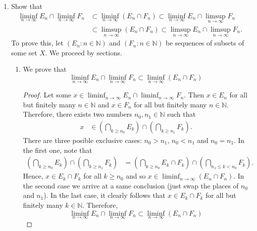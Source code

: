 \documentclass[12pt]{article}
\newcommand{\N}{\mathbb{N}}
\newenvironment{problem}[2][Problem]{\begin{trivlist}
		\item[\hskip \labelsep {\bfseries #1}\hskip \labelsep {\bfseries #2.}]}{\end{trivlist}}
\begin{document}
\begin{problem}{1}
\begin{enumerate}[label=(\alph*)]
	\item Show that
	\begin{align*}
		\liminf_{n\to \infty} E_{n} \cap \liminf_{n\to \infty} F_{n} &\subset \liminf_{n\to \infty} \left(E_{n} \cap F_{n}\right) \subset \liminf_{n\to \infty} E_{n} \cap \limsup_{n\to \infty} F_{n}\\
		& \subset \limsup_{n\to \infty} \left(E_{n} \cap F_{n}\right) \subset \limsup_{n\to \infty}  E_{n} \cap \limsup_{n\to \infty} F_{n}.
	\end{align*}
	To prove this, let $\left(E_{n} : n\in \N\right)$ and $\left(F_{n} : n\in \N\right)$ be sequences of subsets of some set $X$. We proceed by sections.\\
	\begin{enumerate}[label=\textbf{\arabic*.}]
		\item We prove that
		\begin{equation*}
			\liminf_{n\to \infty} E_{n} \cap \liminf_{n\to \infty} F_{n} \subset \liminf_{n\to \infty} \left(E_{n} \cap F_{n}\right)
		\end{equation*}
		\begin{proof}
			Let some $x\in 	\liminf_{n\to \infty} E_{n} \cap \liminf_{n\to \infty} F_{n}$. Then $x\in E_{n}$ for all but finitely many $n\in \N$ and $x\in F_{n}$ for all but finitely many $n\in \N$. Therefore, there exists two numbers $n_{0},n_{1} \in \N$ such that 
			\begin{align*}
				x &\in \left(\bigcap_{k\geq n_{0}} E_{k}\right) \cap \left(\bigcap_{k\geq n_{1}} F_{k}\right).
			\end{align*}
		There are three posible exclusive cases: $n_{0}> n_{1}$, $n_{0} < n_{1}$ and $n_{0} = n_{1}$. In the first one, note that 
		\begin{align*}
			\left(\bigcap_{k\geq n_{0}} E_{k}\right) \cap \left(\bigcap_{k\geq n_{1}} F_{k}\right) &= \left(\bigcap_{k\geq n_{0}} E_{k}\cap F_{k}\right) \cap \left(\bigcap_{n_{1 }\leq k< n_{0} } F_{k}\right).
		\end{align*}
	Hence, $x\in E_{k}\cap F_{k}$ for all $k\geq n_{0}$  and so $x\in \liminf_{n\to \infty} \left(E_{n} \cap F_{n}\right)$. In the second case we arrive at a same conclusion (just swap the places of $n_{0}$ and $n_{1}$). In the last case, it clearly follows that $x\in E_{k} \cap F_{k}$ for all but finitely many $k\in \N$.
	Therefore,
	\begin{equation*}
			\liminf_{n\to \infty} E_{n} \cap \liminf_{n\to \infty} F_{n} \subset \liminf_{n\to \infty} \left(E_{n} \cap F_{n}\right)
	\end{equation*}
		\end{proof}
	

\end{enumerate}
\end{enumerate}
\end{problem}
\end{document}
